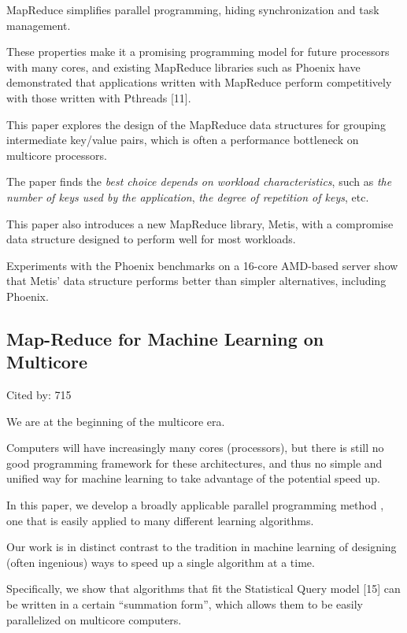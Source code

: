 \documentclass[a4paper,11pt]{article}
\begin{document}
{{{MapReduce simplifies parallel programming, hiding synchronization and task management. 

These properties make it a promising programming model for future processors with many cores, and 
existing MapReduce libraries such as Phoenix have demonstrated that applications written
with MapReduce perform competitively with those written with Pthreads [11].

This paper 
explores the design of the MapReduce data structures for grouping intermediate key/value pairs,
which is often a performance bottleneck on multicore processors. 

The paper finds the 
{\em best choice depends on workload characteristics}, 
such as 
{\em the number of keys used by the application}, 
{\em the degree of repetition of keys}, 
etc. 

This paper also introduces a new MapReduce library, 
{\color{black} Metis\cite{metis}}, 
with a compromise data structure designed to perform well for most workloads. 

Experiments with the Phoenix benchmarks on a 16-core AMD-based server
show that 
Metis' data structure performs better than simpler alternatives, 
including Phoenix.	

}

\subsection*{Map-Reduce for Machine Learning on Multicore}
{\color{cyan} {\color{magenta} Cited by: 715}

We are at the beginning of the multicore era. 

Computers will have increasingly many cores (processors), 
but there is still 
no good programming framework for these architectures, and thus 
no simple and unified way for machine learning to take advantage of the potential speed up. 

In this paper, we develop 
{\color{black} a broadly applicable parallel programming method \cite{mapredlearning}}, 
one that is easily applied to many different learning algorithms. 

Our work is in distinct contrast to the tradition in machine learning of 
designing (often ingenious) ways to speed up a single algorithm at a time. 

Specifically, 
we show that algorithms that fit the Statistical Query model [15] can be written in a certain ``summation form'', 
which allows them to be easily parallelized on multicore computers. 

}}}
\end{document}
